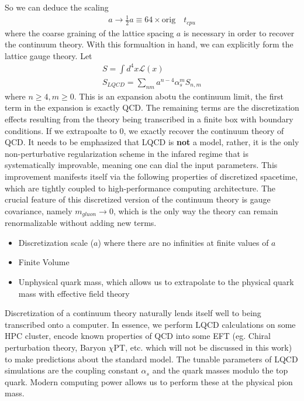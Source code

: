 So we can deduce the scaling 
\begin{align}
    a \rightarrow \frac{1}{2}a \equiv 64 \times \text{orig} \quad t_{cpu}
\end{align} 
where the coarse graining of the lattice spacing $a$ is necessary in order to recover the continuum theory. With this formualtion in hand, we can explicitly form the lattice gauge theory. 
Let 
\begin{align}
    S = \int d^4x \mathcal{L}(x) \\
    S_{LQCD} = \sum_{nm}^{} a^{n-4}\alpha_s^m S_{n,m} 
\end{align} where $n\geq4,m\geq0$. This is an expansion abotu the continuum limit, the first term in the expansion is exactly QCD. The remaining terms are the discretization effects resulting from the theory being transcribed in a finite box with boundary conditions. If we extrapoalte to 0, we exactly recover the continuum theory of QCD. 
It needs to be emphasized that LQCD is \textbf{not} a model, rather, it is the only non-perturbative regularization scheme in the infared regime that is systematically improvable, meaning one can dial the input parameters. This improvement manifests itself via the following properties of discretized spacetime, which are tightly coupled to high-performance computing architecture. The crucial feature of this discretized version of the continuum theory is gauge covariance, namely $m_{gluon} \rightarrow 0$, which is the only way the theory can remain renormalizable without adding new terms.  
\begin{itemize}
    \item Discretization scale ($a$) where there are no infinities at finite values of $a$
    \item Finite Volume 
    \item Unphysical quark mass, which allows us to extrapolate to the physical quark mass with effective field theory 
\end{itemize}


Discretization of a continuum theory naturally lends itself well to being transcribed onto a computer. In essence, we perform LQCD calculations on some HPC cluster, encode known properties of QCD into some EFT (eg. Chiral perturbation theory, Baryon $\chi$PT, etc. which will not be discussed in this work) to make predictions about the standard model. The tunable parameters of LQCD simulations are the coupling constant $\alpha_s$ and the quark masses modulo the top quark.  Modern computing power allows us to perform these at the physical pion mass. 

